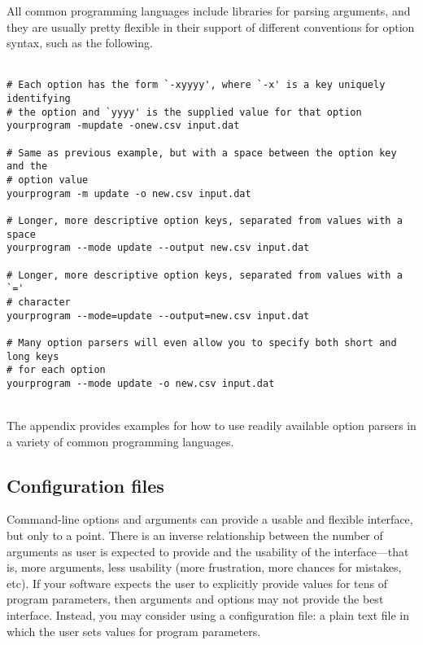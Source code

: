\documentclass{article}
\begin{document}
All common programming languages include libraries for parsing arguments, and they are usually pretty flexible in their support of different conventions for option syntax, such as the following.
\\ \\
\begin{verbatim}
# Each option has the form `-xyyyy', where `-x' is a key uniquely identifying
# the option and `yyyy' is the supplied value for that option
yourprogram -mupdate -onew.csv input.dat

# Same as previous example, but with a space between the option key and the
# option value
yourprogram -m update -o new.csv input.dat

# Longer, more descriptive option keys, separated from values with a space
yourprogram --mode update --output new.csv input.dat

# Longer, more descriptive option keys, separated from values with a `='
# character
yourprogram --mode=update --output=new.csv input.dat

# Many option parsers will even allow you to specify both short and long keys
# for each option
yourprogram --mode update -o new.csv input.dat
\end{verbatim}
\\

The appendix provides examples for how to use readily available option parsers in a variety of common programming languages.

\subsection{Configuration files}
Command-line options and arguments can provide a usable and flexible interface, but only to a point. There is an inverse relationship between the number of arguments as user is expected to provide and the usability of the interface---that is, more arguments, less usability (more frustration, more chances for mistakes, etc). If your software expects the user to explicitly provide values for tens of program parameters, then arguments and options may not provide the best interface. Instead, you may consider using a configuration file: a plain text file in which the user sets values for program parameters.
\end{document}
